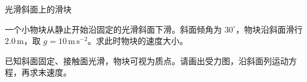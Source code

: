 \documentclass[11pt,a4paper]{article}
\begin{document}
\begin{center}\Large 光滑斜面上的滑块\end{center}
一个小物块从静止开始沿固定的光滑斜面下滑。斜面倾角为 $30^\circ$，物块沿斜面滑行 $2.0\,\mathrm m$，取 $g=10\,\mathrm{m\,s^{-2}}$。求此时物块的速度大小。
\begin{center}\end{center}

已知斜面固定、接触面光滑，物块可视为质点。请画出受力图，沿斜面列运动方程，再求末速度。
\end{document}
